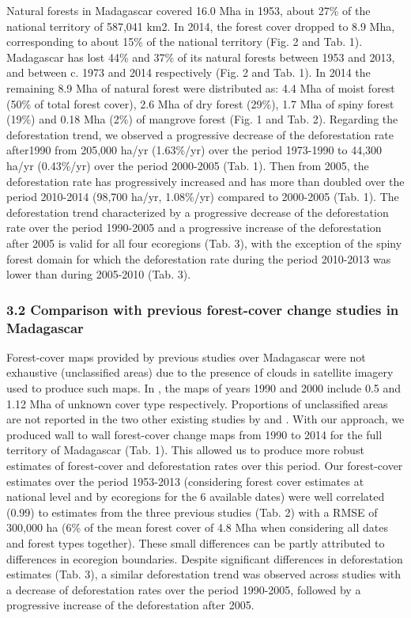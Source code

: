 \documentclass[]{article}
\begin{document}
Natural forests in Madagascar covered 16.0 Mha in 1953, about 27\% of
the national territory of 587,041 km2. In 2014, the forest cover dropped
to 8.9 Mha, corresponding to about 15\% of the national territory (Fig.
2 and Tab. 1). Madagascar has lost 44\% and 37\% of its natural forests
between 1953 and 2013, and between c. 1973 and 2014 respectively (Fig. 2
and Tab. 1). In 2014 the remaining 8.9 Mha of natural forest were
distributed as: 4.4 Mha of moist forest (50\% of total forest cover),
2.6 Mha of dry forest (29\%), 1.7 Mha of spiny forest (19\%) and 0.18
Mha (2\%) of mangrove forest (Fig. 1 and Tab. 2). Regarding the
deforestation trend, we observed a progressive decrease of the
deforestation rate after1990 from 205,000 ha/yr (1.63\%/yr) over the
period 1973-1990 to 44,300 ha/yr (0.43\%/yr) over the period 2000-2005
(Tab. 1). Then from 2005, the deforestation rate has progressively
increased and has more than doubled over the period 2010-2014 (98,700
ha/yr, 1.08\%/yr) compared to 2000-2005 (Tab. 1). The deforestation
trend characterized by a progressive decrease of the deforestation rate
over the period 1990-2005 and a progressive increase of the
deforestation after 2005 is valid for all four ecoregions (Tab. 3), with
the exception of the spiny forest domain for which the deforestation
rate during the period 2010-2013 was lower than during 2005-2010 (Tab.
3).

\hypertarget{comparison-with-previous-forest-cover-change-studies-in-madagascar}{%
\subsubsection{3.2 Comparison with previous forest-cover change studies
in
Madagascar}\label{comparison-with-previous-forest-cover-change-studies-in-madagascar}}

Forest-cover maps provided by previous studies over Madagascar were not
exhaustive (unclassified areas) due to the presence of clouds in
satellite imagery used to produce such maps. In \citet{Harper2007}, the
maps of years 1990 and 2000 include 0.5 and 1.12 Mha of unknown cover
type respectively. Proportions of unclassified areas are not reported in
the two other existing studies by \citet{MEFT2009} and \citet{ONE2015}.
With our approach, we produced wall to wall forest-cover change maps
from 1990 to 2014 for the full territory of Madagascar (Tab. 1). This
allowed us to produce more robust estimates of forest-cover and
deforestation rates over this period. Our forest-cover estimates over
the period 1953-2013 (considering forest cover estimates at national
level and by ecoregions for the 6 available dates) were well correlated
(0.99) to estimates from the three previous studies (Tab. 2) with a RMSE
of 300,000 ha (6\% of the mean forest cover of 4.8 Mha when considering
all dates and forest types together). These small differences can be
partly attributed to differences in ecoregion boundaries. Despite
significant differences in deforestation estimates (Tab. 3), a similar
deforestation trend was observed across studies with a decrease of
deforestation rates over the period 1990-2005, followed by a progressive
increase of the deforestation after 2005.
\end{document}
